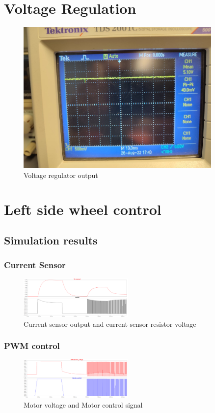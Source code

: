 \clearpage
\section{Voltage Regulation}
\begin{figure}[H]
\centering
\includegraphics[width = 0.9\textwidth]{./Figures/Volt_Reg_Noise.jpeg}
\caption{Voltage regulator output}
\label{fig:volt_reg_noise}
\end{figure}

\clearpage
\section{Left side wheel control}
\subsection{Simulation results}
\subsubsection{Current Sensor}
\begin{figure}[H]
\centering
\includegraphics[width = 0.5\textwidth]{./Figures/CurSens_Left_Sim.png}
\caption{Current sensor output and current sensor resistor voltage}
\label{fig:CurSens_Left_Sim}
\end{figure}
\subsubsection{PWM control}
\begin{figure}[H]
\centering
\includegraphics[width = 0.5\textwidth]{./Figures/PWM_Ctrl_Sim.png}
\caption{Motor voltage and Motor control signal}
\label{fig:PWM_ctrl_sim}
\end{figure}

